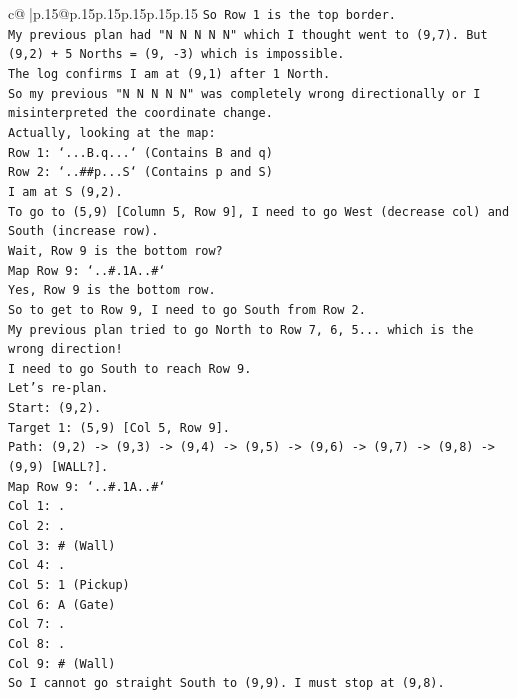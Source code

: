 \documentclass{article}
\begin{document}
{\begin{supertabular}{c@{$\;$}|p{.15\linewidth}@{}p{.15\linewidth}p{.15\linewidth}p{.15\linewidth}p{.15\linewidth}p{.15\linewidth}}
{{{\texttt{So Row 1 is the top border.} \\
\texttt{My previous plan had "N N N N N" which I thought went to (9,7). But (9,2) + 5 Norths = (9, {-}3) which is impossible.} \\
\texttt{The log confirms I am at (9,1) after 1 North.} \\
\texttt{So my previous "N N N N N" was completely wrong directionally or I misinterpreted the coordinate change.} \\
\texttt{Actually, looking at the map:} \\
\texttt{Row 1: `...B.q...` (Contains B and q)} \\
\texttt{Row 2: `..\#\#p...S` (Contains p and S)} \\
\texttt{I am at S (9,2).} \\
\texttt{To go to (5,9) {[}Column 5, Row 9{]}, I need to go West (decrease col) and South (increase row).} \\
\texttt{Wait, Row 9 is the bottom row?} \\
\texttt{Map Row 9: `..\#.1A..\#`} \\
\texttt{Yes, Row 9 is the bottom row.} \\
\texttt{So to get to Row 9, I need to go South from Row 2.} \\
\texttt{My previous plan tried to go North to Row 7, 6, 5... which is the wrong direction!} \\
\texttt{I need to go South to reach Row 9.} \\
\texttt{Let's re{-}plan.} \\
\texttt{Start: (9,2).} \\
\texttt{Target 1: (5,9) {[}Col 5, Row 9{]}.} \\
\texttt{Path: (9,2) {-}> (9,3) {-}> (9,4) {-}> (9,5) {-}> (9,6) {-}> (9,7) {-}> (9,8) {-}> (9,9) {[}WALL?{]}.} \\
\texttt{Map Row 9: `..\#.1A..\#`} \\
\texttt{Col 1: .} \\
\texttt{Col 2: .} \\
\texttt{Col 3: \# (Wall)} \\
\texttt{Col 4: .} \\
\texttt{Col 5: 1 (Pickup)} \\
\texttt{Col 6: A (Gate)} \\
\texttt{Col 7: .} \\
\texttt{Col 8: .} \\
\texttt{Col 9: \# (Wall)} \\
\texttt{So I cannot go straight South to (9,9). I must stop at (9,8).} \\
}}}
\end{supertabular}}
\end{document}

